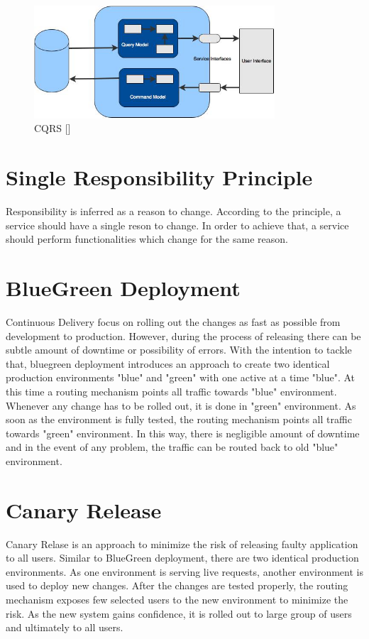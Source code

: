 \begin{figure}[H]
\begin{center}
\includegraphics[width=0.8\textwidth]{figures/Appendices_one_cqrs}
\caption{CQRS [\cite{Fowler:2011ab}]}
\label{fig:appendices/cqrs}
\end{center}
\end{figure}

\section{Single Responsibility Principle}\label{section:appendices/single_responsibility_principle}
Responsibility is inferred as a reason to change. According to the principle, a service should have a single reson to change. In order to achieve that, a service should perform functionalities which change for the same reason. \cite{Martin:2009aa} \cite{Stine:2014aa}

\section{BlueGreen Deployment}\label{section:appendices/blue_green_deployment}
Continuous Delivery focus on rolling out the changes as fast as possible from development to production. However, during the process of releasing there can be subtle amount of downtime or possibility of errors. With the intention to tackle that, bluegreen deployment introduces an approach to create two identical production environments "blue" and "green" with one active at a time "blue". At this time a routing mechanism points all traffic towards "blue" environment. Whenever any change has to be rolled out, it is done in "green" environment. As soon as the environment is fully tested, the routing mechanism points all traffic towards "green" environment. In this way, there is negligible amount of downtime and in the event of any problem, the traffic can be routed back to old "blue" environment.

\section{Canary Release}\label{section:appendices/canary_release}
Canary Relase is an approach to minimize the risk of releasing faulty application to all users. Similar to BlueGreen deployment, there are two identical production environments. As one environment is serving live requests, another environment is used to deploy new changes. After the changes are tested properly, the routing mechanism exposes few selected users to the new environment to minimize the risk. As the new system gains confidence, it is rolled out to large group of users and ultimately to all users.